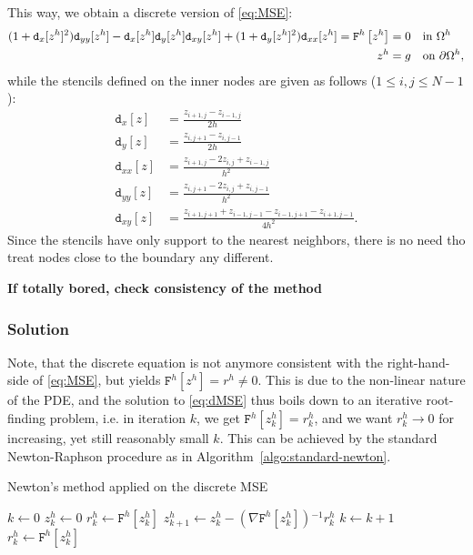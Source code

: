 \documentclass[11pt]{scrartcl}
\newcommand{\mSurfDisc}[1]{\ensuremath{\mathtt{F}^h\left[#1\right]}}
\newcommand{\Dx}[1]{\ensuremath{\mathtt{d}_x[#1]}}
\newcommand{\Dy}[1]{\ensuremath{\mathtt{d}_y[#1]}}
\newcommand{\Dxx}[1]{\ensuremath{\mathtt{d}_{xx}[#1]}}
\newcommand{\Dyy}[1]{\ensuremath{\mathtt{d}_{yy}[#1]}}
\newcommand{\Dxy}[1]{\ensuremath{\mathtt{d}_{xy}[#1]}}
\newcommand{\inv}{\ensuremath{^{-1}}}
\begin{document}
This way, we obtain a discrete version of \eqref{eq:MSE}:
\begin{align}
	(1+\Dx{z^h}^2)\Dyy{z^h}-\Dx{z^h} \Dy{z^h}\Dxy{z^h} + (1+\Dy{z^h}^2)\Dxx{z^h} = \mSurfDisc{z^h} &= 0  \quad \text{in } \Omega^h \notag \\
	z^h &= g \quad \text{on } \partial\Omega^h \label{eq:dMSE},
\end{align}
while the stencils defined on the inner nodes are given as follows ($1 \le i,j \le N-1$):
\begin{align}
	\Dx{z} &= \frac{z_{i+1,j}-z_{i-1,j}}{2h} \\
	\Dy{z} &= \frac{z_{i,j+1}-z_{i,j-1}}{2h} \\
	\Dxx{z} &= \frac{z_{i+1,j} - 2z_{i,j} + z_{i-1,j}}{h^2}\\
	\Dyy{z} &= \frac{z_{i,j+1} - 2z_{i,j} + z_{i,j-1}}{h^2}\\
	\Dxy{z} &= \frac{z_{i+1,j+1} + z_{i-1,j-1} - z_{i-1,j+1}-z_{i+1,j-1}}{4h^2}. 
\end{align}
Since the stencils have only support to the nearest neighbors, there is no need tho treat nodes close to the boundary any different. 

\textbf{If totally bored, check consistency of the method}


\subsubsection{Solution}
Note, that the discrete equation is not anymore consistent with the right-hand-side of \eqref{eq:MSE}, but yields $\mSurfDisc{z^h} = r^h \neq 0$. This is due to the non-linear nature of the PDE, and the solution to \eqref{eq:dMSE} thus boils down to an iterative root-finding problem, i.e. in iteration $k$, we get $\mSurfDisc{z^h_k}=r^h_k$, and we want $r^h_k \to 0$ for increasing, yet still reasonably small $k$. This can be achieved by the standard Newton-Raphson procedure as in Algorithm~\ref{algo:standard-newton}.
\begin{algorithm}
	\caption{Newton's method applied on the discrete MSE}\label{algo:standard-newton}
	\begin{algorithmic}
		\State $k \gets 0$ 
		\State $z^h_k \gets 0 $ 
		\State $r^h_k \gets \mSurfDisc{z^h_k}$
		 
			\State $z^h_{k+1} \gets z^h_{k} - \left(\nabla\mSurfDisc{z^h_k}\right)\inv r^h_k $
			\State $k \gets k+1$ 
			\State $r^h_k \gets \mSurfDisc{z^h_k}$
		\EndWhile
	\end{algorithmic}
\end{algorithm}
\end{document}
